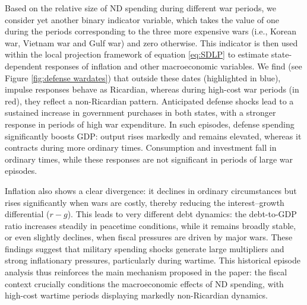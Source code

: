 \documentclass[12pt]{article}%
\theoremstyle{remark}
\begin{document}
Based on the relative size of ND spending during different war periods, we consider yet another binary indicator variable, which takes the value of one during the periods corresponding to the three more expensive wars (i.e., Korean war, Vietnam war and Gulf war) and zero otherwise. This indicator is then used within the local projection framework of equation \eqref{eq:SDLP} to estimate state-dependent responses of inflation and other macroeconomic variables. 
We find (see Figure \ref{fig:defense wardates}) that outside these dates (highlighted in blue), impulse responses behave as Ricardian, whereas during high-cost war periods (in
red), they reflect a non-Ricardian pattern. 
Anticipated defense shocks lead to a sustained increase in government purchases in both states, with a  stronger response in periods of high war expenditure. In such episodes, defense spending significantly boosts GDP: output rises markedly and remains elevated, whereas it contracts during more ordinary times. Consumption and investment  fall in ordinary times, while these responses are not significant in periods of large war episodes.

Inflation also shows a clear divergence: it declines in ordinary circumstances but rises significantly when wars are costly, thereby reducing the interest–growth differential ($r-g$). This leads to very different debt dynamics: the debt-to-GDP ratio increases steadily in peacetime conditions, while it remains broadly stable, or even slightly declines, when fiscal pressures are driven by major wars.
These findings suggest that military spending shocks generate large multipliers and strong inflationary pressures, particularly during wartime. This historical episode analysis thus reinforces the main mechanism proposed in the paper: the fiscal context crucially conditions the macroeconomic effects of ND spending, with high-cost wartime periods displaying markedly non-Ricardian dynamics.
\end{document}
